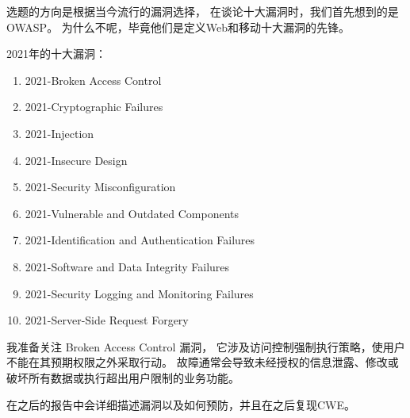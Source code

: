 \documentclass[onecolumn,oneside]{BUPTHomework}
\begin{document}
  选题的方向是根据当今流行的漏洞选择，
  在谈论十大漏洞时，我们首先想到的是OWASP。
  为什么不呢，毕竟他们是定义Web和移动十大漏洞的先锋。

  2021年的十大漏洞\cite{owasp.org.top10}：
  \begin{enumerate}
    \item 2021-Broken Access Control
    \item 2021-Cryptographic Failures
    \item 2021-Injection
    \item 2021-Insecure Design
    \item 2021-Security Misconfiguration
    \item 2021-Vulnerable and Outdated Components
    \item 2021-Identification and Authentication Failures
    \item 2021-Software and Data Integrity Failures
    \item 2021-Security Logging and Monitoring Failures
    \item 2021-Server-Side Request Forgery
  \end{enumerate}

  我准备关注 Broken Access Control\cite{owasp.org.top10.1} 漏洞，
  它涉及访问控制强制执行策略，使用户不能在其预期权限之外采取行动。
  故障通常会导致未经授权的信息泄露、修改或破坏所有数据或执行超出用户限制的业务功能。

  在之后的报告中会详细描述漏洞以及如何预防，并且在之后复现CWE。

  \newpage
  
  
\end{document}
